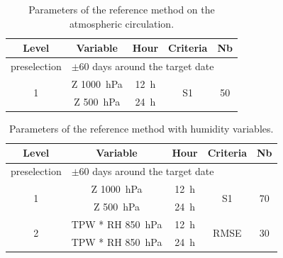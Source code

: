 \documentclass[twocol]{ametsoc}
\begin{document}
\begin{table}[htbp]
	\footnotesize
	\caption{Parameters of the reference method on the atmospheric circulation.}
	\begin{center}
		\begin{tabular}{ccccc}
			\hline \textbf{Level} & \textbf{Variable} & \textbf{Hour} & \textbf{Criteria} & \textbf{Nb} \\ 
			\hline 
			preselection & \multicolumn{4}{l}{$\pm 60$ days around the target date} \\
			\hline 
			\multirow{2}{*}{1} & Z 1000~hPa & 12~h & \multirow{2}{*}{S1} & \multirow{2}{*}{50} \\
			& Z 500~hPa & 24~h & & \\ 
			\hline 
		\end{tabular} 
	\end{center}
	\label{table:params_R1}
\end{table}


\begin{table}[htbp]
	\footnotesize
	\caption{Parameters of the reference method with humidity variables.}
	\begin{center}
		\begin{tabular}{ccccc}
			\hline \textbf{Level} & \textbf{Variable} & \textbf{Hour} & \textbf{Criteria} & \textbf{Nb} \\ 
			\hline 
			preselection & \multicolumn{4}{l}{$\pm 60$ days around the target date} \\
			\hline 
			\multirow{2}{*}{1} & Z 1000~hPa & 12~h & \multirow{2}{*}{S1} & \multirow{2}{*}{70} \\
			& Z 500~hPa & 24~h & & \\ 
			\hline
			\multirow{2}{*}{2} & TPW * RH 850~hPa & 12~h & \multirow{2}{*}{RMSE} & \multirow{2}{*}{30} \\
			& TPW * RH 850~hPa & 24~h & & \\ 
			\hline 
		\end{tabular} 
	\end{center}
	\label{table:params_R2}
\end{table}
\end{document}
